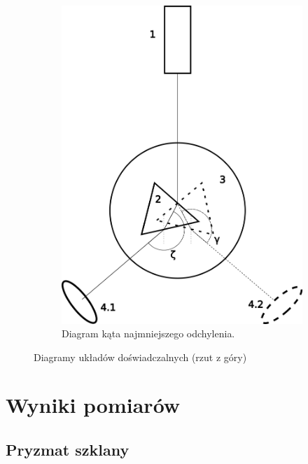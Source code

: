 \documentclass[12pt]{article}
\begin{document}
\begin{figure}[H]
\begin{subfigure}{0.3\textwidth}
        \includegraphics[width=\linewidth]{kat_minimalny}
        \caption{Diagram kąta najmniejszego odchylenia.}
        \label{fig:diagram_kat_minimalny}
    \end{subfigure}
    \caption{Diagramy układów doświadczalnych (rzut z góry)}
\end{figure}

\section{Wyniki pomiarów}

\subsection{Pryzmat szklany}
\end{document}
